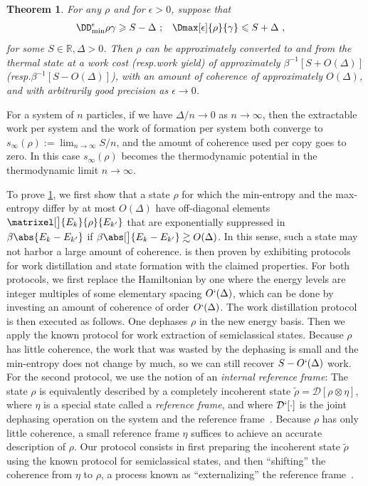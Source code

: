 \documentclass[prl,reprint,longbibliography,superscriptaddress]{revtex4-1}
\renewcommand{\Dminz}[1][]{\DD_{\mathrm{min}}^{#1}}
\newcounter{thm}
\newtheorem{maintheorem}[thm]{Theorem}
\begin{document}
\begin{maintheorem}
  \label{mainthm:equipartition-implies-reversibility-by-TO}
  For any $\rho$ and for $\epsilon>0$, suppose that
  \begin{align*}
    \Dminz[\epsilon]{\rho}{\gamma} &\geqslant S-\Delta\ ;
    &
    \Dmax[\epsilon]{\rho}{\gamma} &\leqslant S+\Delta\ ,
  \end{align*}
  for some $S\in\mathbb{R}, \Delta>0$.  Then $\rho$ can be approximately
  converted to and from the thermal state at a work cost (resp.\@ work yield) of
  approximately $\beta^{-1}[S+O(\Delta)]$ (resp.\@ $\beta^{-1}[S-O(\Delta)]$),
  with an amount of coherence of approximately $O(\Delta)$, and with arbitrarily
  good precision as $\epsilon\to0$.
\end{maintheorem}

For a system of $n$ particles, if we have $\Delta/n \to 0$ as $n\to\infty$, then
the extractable work per system and the work of formation per system both
converge to $s_\infty(\rho) := \lim_{n\to\infty} S/n$, and the amount of
coherence used per copy goes to zero.  In this case $s_\infty(\rho)$ becomes the
thermodynamic potential in the thermodynamic limit $n\to\infty$.

To prove \cref{mainthm:equipartition-implies-reversibility-by-TO}, we first show
that a state $\rho$ for which the min-entropy and the max-entropy differ by at
most $O(\Delta)$ have off-diagonal elements $\matrixel[\big]{E_k}{\rho}{E_{k'}}$ that
are exponentially suppressed in $\beta\abs{E_k-E_{k'}}$ if
$\beta\abs[\big]{E_k-E_{k'}}\gtrsim O(\Delta)$.  In this sense, such a state may not
harbor a large amount of coherence.
%
 is then proven by
exhibiting protocols for work distillation and state formation with the claimed
properties.
%
For both protocols, we first replace the Hamiltonian by one where the energy
levels are integer multiples of some elementary spacing $O`(\Delta)$, which can
be done by investing an amount of coherence of order $O`(\Delta)$.
%
The work distillation protocol is then executed as follows.  One dephases $\rho$
in the new energy basis.  Then we apply the known protocol for work extraction
of semiclassical states.  Because $\rho$ has little coherence, the work that was
wasted by the dephasing is small and the min-entropy does not change by much, so
we can still recover $S-O`(\Delta)$ work.
%
For the second protocol, we use the notion of an \emph{internal reference
  frame}: The state $\rho$ is equivalently described by a completely incoherent
state $\tilde{\rho} = \mathcal{D}[\rho\otimes\eta]$, where $\eta$ is a special
state called a \emph{reference frame}, and where $\mathcal{D}`[\cdot]$ is the
joint dephasing operation on the system and the reference
frame~\cite{Bartlett2006IJQI_dialogue,Bartlett2007_refframes}.  Because $\rho$
has only little coherence, a small reference frame $\eta$ suffices to achieve an
accurate description of $\rho$.  Our protocol consists in first preparing the
incoherent state $\tilde{\rho}$ using the known protocol for semiclassical
states, and then ``shifting'' the coherence from $\eta$ to $\rho$, a process
known as ``externalizing'' the reference frame~\cite{Bartlett2007_refframes}.
\end{document}
